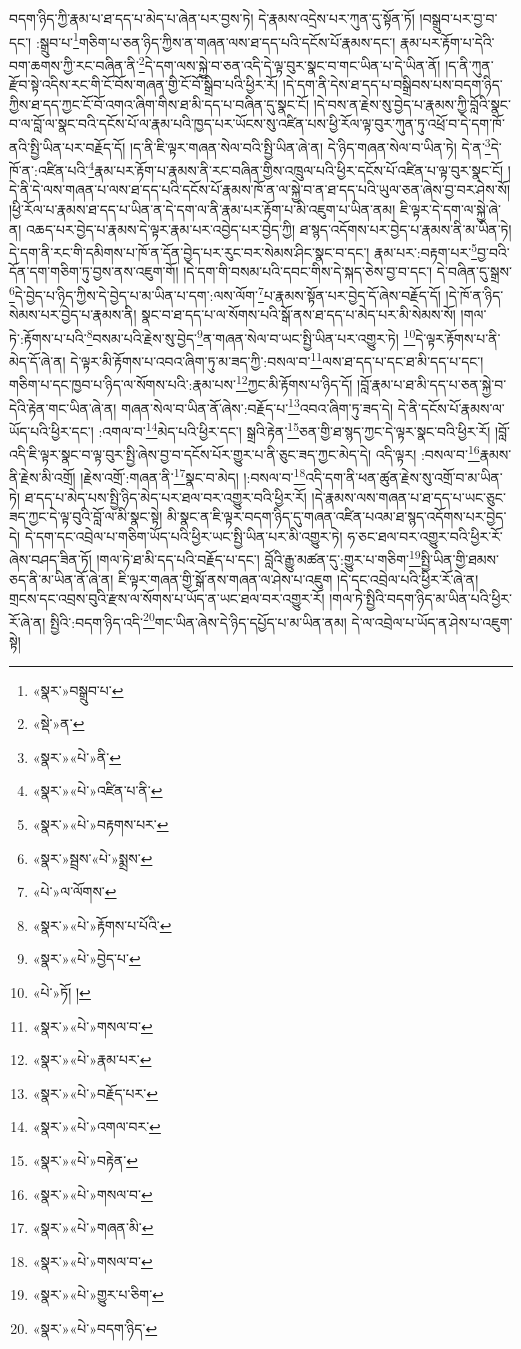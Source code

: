 བདག་ཉིད་ཀྱི་རྣམ་པ་ཐ་དད་པ་མེད་པ་ཞེན་པར་བྱས་ཏེ། དེ་རྣམས་འདྲེས་པར་ཀུན་དུ་སྟོན་ཏོ། །བསྒྲུབ་པར་བྱ་བ་དང་། :སྒྲུབ་པ་\footnote{«སྣར་»བསྒྲུབ་པ་}གཅིག་པ་ཅན་ཉིད་ཀྱིས་ན་གཞན་ལས་ཐ་དད་པའི་དངོས་པོ་རྣམས་དང་། རྣམ་པར་རྟོག་པ་དེའི་བག་ཆགས་ཀྱི་རང་བཞིན་ནི་\footnote{«སྡེ་»ན་}དེ་དག་ལས་སྐྱེ་བ་ཅན་འདི་དེ་ལྟ་བུར་སྣང་བ་གང་ཡིན་པ་དེ་ཡིན་ནོ། །ད་ནི་ཀུན་རྫོབ་སྟེ་འདིས་རང་གི་ངོ་བོས་གཞན་གྱི་ངོ་བོ་སྒྲིབ་པའི་ཕྱིར་རོ། །དེ་དག་ནི་དེས་ཐ་དད་པ་བསྒྲིབས་པས་བདག་ཉིད་ཀྱིས་ཐ་དད་ཀྱང་ངོ་བོ་འགའ་ཞིག་གིས་ཐ་མི་དད་པ་བཞིན་དུ་སྣང་ངོ། །དེ་བས་ན་རྗེས་སུ་བྱེད་པ་རྣམས་ཀྱི་བློའི་སྣང་བ་ལ་བློ་ལ་སྣང་བའི་དངོས་པོ་ལ་རྣམ་པའི་ཁྱད་པར་ཡོངས་སུ་འཛིན་པས་ཕྱི་རོལ་ལྟ་བུར་ཀུན་ཏུ་འཕྲོ་བ་དེ་དག་ཁོ་ནའི་སྤྱི་ཡིན་པར་བརྗོད་དོ། །ད་ནི་ཇི་ལྟར་གཞན་སེལ་བའི་སྤྱི་ཡིན་ཞེ་ན། དེ་ཉིད་གཞན་སེལ་བ་ཡིན་ཏེ། དེ་ན་\footnote{«སྣར་»«པེ་»ནི་}དེ་ཁོ་ན་:འཛིན་པའི་\footnote{«སྣར་»«པེ་»འཛིན་པ་ནི་}རྣམ་པར་རྟོག་པ་རྣམས་ནི་རང་བཞིན་གྱིས་འཁྲུལ་པའི་ཕྱིར་དངོས་པོ་འཛིན་པ་ལྟ་བུར་སྣང་ངོ། །དེ་ནི་དེ་ལས་གཞན་པ་ལས་ཐ་དད་པའི་དངོས་པོ་རྣམས་ཁོ་ན་ལ་སྐྱེ་བ་ན་ཐ་དད་པའི་ཡུལ་ཅན་ཞེས་བྱ་བར་ཤེས་སོ། །ཕྱི་རོལ་པ་རྣམས་ཐ་དད་པ་ཡིན་ན་དེ་དག་ལ་ནི་རྣམ་པར་རྟོག་པ་མི་འཇུག་པ་ཡིན་ནམ། ཇི་ལྟར་དེ་དག་ལ་སྐྱེ་ཞེ་ན། འཆད་པར་བྱེད་པ་རྣམས་དེ་ལྟར་རྣམ་པར་འབྱེད་པར་བྱེད་ཀྱི། ཐ་སྙད་འདོགས་པར་བྱེད་པ་རྣམས་ནི་མ་ཡིན་ཏེ། དེ་དག་ནི་རང་གི་དམིགས་པ་ཁོ་ན་དོན་བྱེད་པར་རུང་བར་སེམས་ཤིང་སྣང་བ་དང་། རྣམ་པར་:བརྟག་པར་\footnote{«སྣར་»«པེ་»བརྟགས་པར་}བྱ་བའི་དོན་དག་གཅིག་ཏུ་བྱས་ནས་འཇུག་གོ། །དེ་དག་གི་བསམ་པའི་དབང་གིས་དེ་སྐད་ཅེས་བྱ་བ་དང་། དེ་བཞིན་དུ་སྒྲས་\footnote{«སྣར་»སྦྲས་«པེ་»སྨྲས་}དེ་བྱེད་པ་ཉིད་ཀྱིས་དེ་བྱེད་པ་མ་ཡིན་པ་དག་:ལས་ལོག་\footnote{«པེ་»ལ་ལོགས་}པ་རྣམས་སྟོན་པར་བྱེད་དོ་ཞེས་བརྗོད་དོ། །དེ་ཁོ་ན་ཉིད་སེམས་པར་བྱེད་པ་རྣམས་ནི། སྣང་བ་ཐ་དད་པ་ལ་སོགས་པའི་སྒོ་ནས་ཐ་དད་པ་མེད་པར་མི་སེམས་སོ། །གལ་ཏེ་:རྟོགས་པ་པའི་\footnote{«སྣར་»«པེ་»རྟོགས་པ་པོའི་}བསམ་པའི་རྗེས་སུ་བྱེད་\footnote{«སྣར་»«པེ་»བྱེད་པ་}ན་གཞན་སེལ་བ་ཡང་སྤྱི་ཡིན་པར་འགྱུར་ཏེ། \footnote{«པེ་»ཏོ། ། }དེ་ལྟར་རྟོགས་པ་ནི་མེད་དོ་ཞེ་ན། དེ་ལྟར་མི་རྟོགས་པ་འབའ་ཞིག་ཏུ་མ་ཟད་ཀྱི་:བསལ་བ་\footnote{«སྣར་»«པེ་»གསལ་བ་}ལས་ཐ་དད་པ་དང་ཐ་མི་དད་པ་དང་། གཅིག་པ་དང་ཁྱབ་པ་ཉིད་ལ་སོགས་པའི་:རྣམ་པས་\footnote{«སྣར་»«པེ་»རྣམ་པར་}ཀྱང་མི་རྟོགས་པ་ཉིད་དོ། །བློ་རྣམ་པ་ཐ་མི་དད་པ་ཅན་སྐྱེ་བ་དེའི་རྟེན་གང་ཡིན་ཞེ་ན། གཞན་སེལ་བ་ཡིན་ནོ་ཞེས་:བརྗོད་པ་\footnote{«སྣར་»«པེ་»བརྗོད་པར་}འབའ་ཞིག་ཏུ་ཟད་དེ། དེ་ནི་དངོས་པོ་རྣམས་ལ་ཡོད་པའི་ཕྱིར་དང་། :འགལ་བ་\footnote{«སྣར་»«པེ་»འགལ་བར་}མེད་པའི་ཕྱིར་དང་། སྒྲའི་རྟེན་\footnote{«སྣར་»«པེ་»བརྟེན་}ཅན་གྱི་ཐ་སྙད་ཀྱང་དེ་ལྟར་སྣང་བའི་ཕྱིར་རོ། །བློ་འདི་ཇི་ལྟར་སྣང་བ་ལྟ་བུར་སྤྱི་ཞེས་བྱ་བ་དངོས་པོར་གྱུར་པ་ནི་ཅུང་ཟད་ཀྱང་མེད་དེ། འདི་ལྟར། :བསལ་བ་\footnote{«སྣར་»«པེ་»གསལ་བ་}རྣམས་ནི་རྗེས་མི་འགྲོ། །རྗེས་འགྲོ་:གཞན་ནི་\footnote{«སྣར་»«པེ་»གཞན་མི་}སྣང་བ་མེད། །:བསལ་བ་\footnote{«སྣར་»«པེ་»གསལ་བ་}འདི་དག་ནི་ཕན་ཚུན་རྗེས་སུ་འགྲོ་བ་མ་ཡིན་ཏེ། ཐ་དད་པ་མེད་པས་སྤྱི་ཉིད་མེད་པར་ཐལ་བར་འགྱུར་བའི་ཕྱིར་རོ། །དེ་རྣམས་ལས་གཞན་པ་ཐ་དད་པ་ཡང་ཅུང་ཟད་ཀྱང་དེ་ལྟ་བུའི་བློ་ལ་མི་སྣང་སྟེ། མི་སྣང་ན་ཇི་ལྟར་བདག་ཉིད་དུ་གཞན་འཛིན་པའམ་ཐ་སྙད་འདོགས་པར་བྱེད་དེ། དེ་དག་དང་འབྲེལ་པ་གཅིག་ཡོད་པའི་ཕྱིར་ཡང་སྤྱི་ཡིན་པར་མི་འགྱུར་ཏེ། ཧ་ཅང་ཐལ་བར་འགྱུར་བའི་ཕྱིར་རོ་ཞེས་བཤད་ཟིན་ཏོ། །གལ་ཏེ་ཐ་མི་དད་པའི་བརྗོད་པ་དང་། བློའི་རྒྱུ་མཚན་དུ་:གྱུར་པ་གཅིག་\footnote{«སྣར་»«པེ་»གྱུར་པ་ཅིག་}སྤྱི་ཡིན་གྱི་ཐམས་ཅད་ནི་མ་ཡིན་ནོ་ཞེ་ན། ཇི་ལྟར་གཞན་གྱི་སྒོ་ནས་གཞན་ལ་ཤེས་པ་འཇུག །དེ་དང་འབྲེལ་པའི་ཕྱིར་རོ་ཞེ་ན། གྲངས་དང་འབྲས་བུའི་རྫས་ལ་སོགས་པ་ཡོད་ན་ཡང་ཐལ་བར་འགྱུར་རོ། །གལ་ཏེ་སྤྱིའི་བདག་ཉིད་མ་ཡིན་པའི་ཕྱིར་རོ་ཞེ་ན། སྤྱིའི་:བདག་ཉིད་འདི་\footnote{«སྣར་»«པེ་»བདག་ཉིད་}གང་ཡིན་ཞེས་དེ་ཉིད་དཔྱོད་པ་མ་ཡིན་ནམ། དེ་ལ་འབྲེལ་པ་ཡོད་ན་ཤེས་པ་འཇུག་སྟེ། 